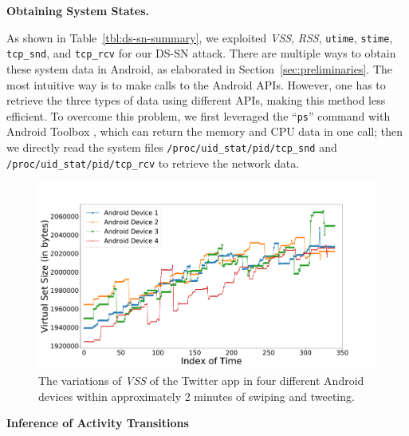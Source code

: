 \documentclass[letterpaper,12pt]{article}
\begin{document}
\textbf{Obtaining System States.}

As shown in Table~\ref{tbl:ds-sn-summary}, we exploited \emph{VSS}, \emph{RSS}, \texttt{utime}, \texttt{stime}, \texttt{tcp\_snd}, and \texttt{tcp\_rcv} for our DS-SN attack. There are multiple ways to obtain these system data in Android, as elaborated in Section~\ref{sec:preliminaries}. The most intuitive way is to make calls to the Android APIs. However, one has to retrieve the three types of data using different APIs, making this method less efficient. To overcome this problem, we first leveraged the ``\texttt{ps}'' command with Android Toolbox \cite{toolbox}, which can return the memory and CPU data in one call; then we directly read the system files \texttt{/proc/uid\_stat/pid/tcp\_snd} and  \texttt{/proc/uid\_stat/pid/tcp\_rcv} to retrieve the network data. 

\begin{figure}[!htb]
  \includegraphics[width=\textwidth]{swipe.pdf}
  \caption{The variations of \emph{VSS} of the Twitter app in four different Android devices within approximately 2 minutes of swiping and tweeting.}
  \label{fig:swipe}
\end{figure}


\textbf{Inference of Activity Transitions}
\end{document}

